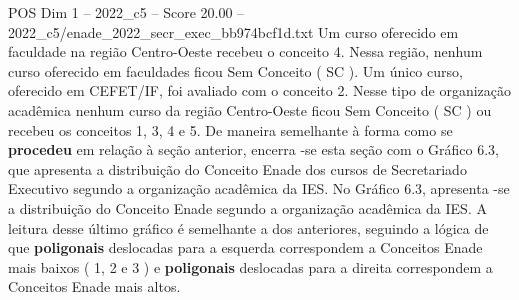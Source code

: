 \begin{textsample}{POS Dim 1 – 2022\_c5 – Score 20.00 – 2022\_c5/enade\_2022\_secr\_exec\_bb974bcf1d.txt}
Um curso oferecido em faculdade na região Centro-Oeste recebeu o conceito 4.
Nessa região, nenhum curso oferecido em faculdades ficou Sem Conceito ( SC ).
Um único curso, oferecido em CEFET/IF, foi avaliado com o conceito 2.
Nesse tipo de organização acadêmica nenhum curso da região Centro-Oeste ficou Sem Conceito ( SC ) ou recebeu os conceitos 1, 3, 4 e 5.
De maneira semelhante à forma como se \textbf{procedeu} em relação à seção anterior, encerra -se esta seção com o Gráfico 6.3, que apresenta a distribuição do Conceito Enade dos cursos de Secretariado Executivo segundo a organização acadêmica da IES.
No Gráfico 6.3, apresenta -se a distribuição do Conceito Enade segundo a organização acadêmica da IES.
A leitura desse último gráfico é semelhante a dos anteriores, seguindo a lógica de que \textbf{poligonais} deslocadas para a esquerda correspondem a Conceitos Enade mais baixos ( 1, 2 e 3 ) e \textbf{poligonais} deslocadas para a direita correspondem a Conceitos Enade mais altos.

\end{textsample}
